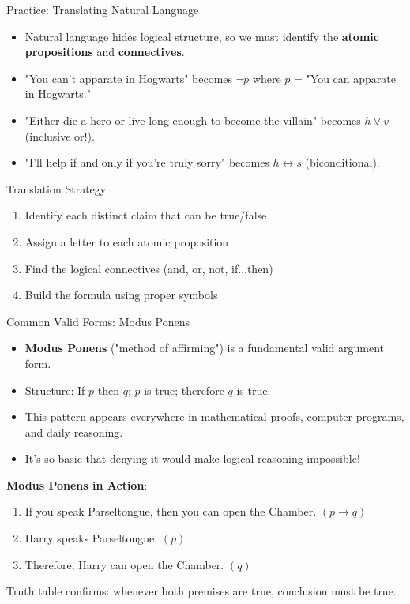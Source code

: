 \documentclass{beamer}
\begin{document}
	\begin{frame}{Practice: Translating Natural Language}
		\begin{itemize}
			\item Natural language hides logical structure, so we must identify the \textbf{atomic propositions} and \textbf{connectives}.
			\item "You can't apparate in Hogwarts" becomes $\neg p$ where $p$ = "You can apparate in Hogwarts."
			\item "Either die a hero or live long enough to become the villain" becomes $h \vee v$ (inclusive or!).
			\item "I'll help if and only if you're truly sorry" becomes $h \leftrightarrow s$ (biconditional).
		\end{itemize}
		
		\begin{block}{Translation Strategy}
			\begin{enumerate}
				\item Identify each distinct claim that can be true/false
				\item Assign a letter to each atomic proposition
				\item Find the logical connectives (and, or, not, if...then)
				\item Build the formula using proper symbols
			\end{enumerate}
		\end{block}
	\end{frame}
	
	\begin{frame}{Common Valid Forms: Modus Ponens}
		\begin{itemize}
			\item \textbf{Modus Ponens} ("method of affirming") is a fundamental valid argument form.
			\item Structure: If $p$ then $q$; $p$ is true; therefore $q$ is true.
			\item This pattern appears everywhere in mathematical proofs, computer programs, and daily reasoning.
			\item It's so basic that denying it would make logical reasoning impossible!
		\end{itemize}
		
		\begin{example}
			\textbf{Modus Ponens in Action}:
			\begin{enumerate}
				\item If you speak Parseltongue, then you can open the Chamber. $(p \rightarrow q)$
				\item Harry speaks Parseltongue. $(p)$
				\item Therefore, Harry can open the Chamber. $(q)$
			\end{enumerate}
			
			Truth table confirms: whenever both premises are true, conclusion must be true.
		\end{example}
	\end{frame}
	
\end{document}
